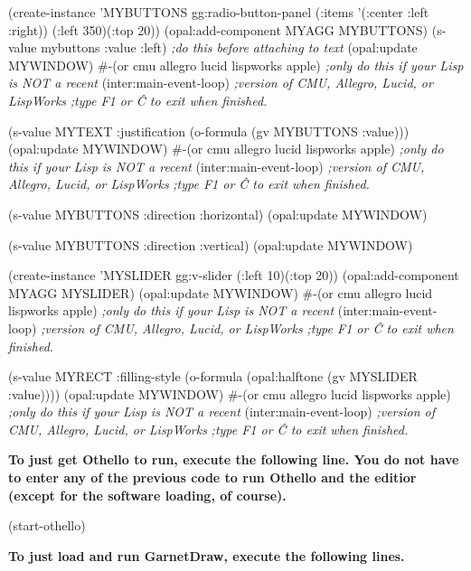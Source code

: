 \begin{programexample}
(create-instance 'MYBUTTONS gg:radio-button-panel
  (:items '(:center :left :right))
  (:left 350)(:top 20))
(opal:add-component MYAGG MYBUTTONS)
(s-value mybuttons :value :left)          {\it ;do this before attaching to text}
(opal:update MYWINDOW)
\#-(or cmu allegro lucid lispworks apple)  {\it ;only do this if your Lisp is NOT a recent}
(inter:main-event-loop)                   {\it ;version of CMU, Allegro, Lucid, or LispWorks}
                                          {\it ;type F1 or \^C to exit when finished.}

(s-value MYTEXT :justification (o-formula (gv MYBUTTONS :value)))
(opal:update MYWINDOW)
\#-(or cmu allegro lucid lispworks apple)  {\it ;only do this if your Lisp is NOT a recent}
(inter:main-event-loop)                   {\it ;version of CMU, Allegro, Lucid, or LispWorks}
                                          {\it ;type F1 or \^C to exit when finished.}

(s-value MYBUTTONS :direction :horizontal)
(opal:update MYWINDOW)

(s-value MYBUTTONS :direction :vertical)
(opal:update MYWINDOW)

(create-instance 'MYSLIDER gg:v-slider
  (:left 10)(:top 20))
(opal:add-component MYAGG MYSLIDER)
(opal:update MYWINDOW)
\#-(or cmu allegro lucid lispworks apple)  {\it ;only do this if your Lisp is NOT a recent}
(inter:main-event-loop)                   {\it ;version of CMU, Allegro, Lucid, or LispWorks}
                                          {\it ;type F1 or \^C to exit when finished.}

(s-value MYRECT :filling-style (o-formula
				(opal:halftone (gv MYSLIDER :value))))
(opal:update MYWINDOW)
\#-(or cmu allegro lucid lispworks apple)  {\it ;only do this if your Lisp is NOT a recent}
(inter:main-event-loop)                   {\it ;version of CMU, Allegro, Lucid, or LispWorks}
                                          {\it ;type F1 or \^C to exit when finished.}
\end{programexample}

{\bf To just get Othello to run, execute the following line.
You do not have to enter any of the previous code to run Othello and
the editior (except for the software loading, of course).}
\begin{programexample}

(start-othello)

\end{programexample}


{\bf To just load and run GarnetDraw, execute the following lines.}

